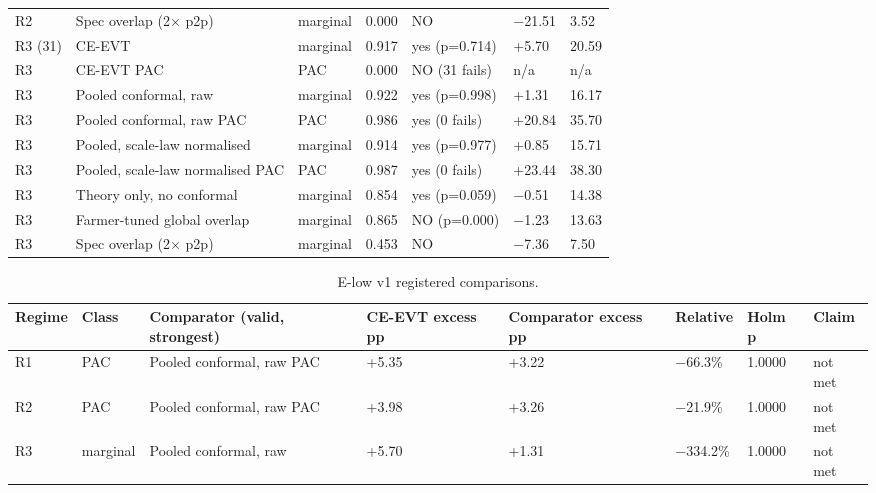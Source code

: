 \documentclass[preprint,12pt,authoryear]{elsarticle}
\begin{document}
\begin{table}[!htbp]
\begin{tabularx}{\textwidth}{@{}>{\raggedright\arraybackslash\hsize=0.70\hsize}X>{\raggedright\arraybackslash\hsize=1.60\hsize}Xll>{\raggedright\arraybackslash\hsize=0.70\hsize}Xll@{}}
R2 & Spec overlap (2× p2p) & marginal & 0.000 & NO & −21.51 & 3.52 \\
R3 (31) & CE-EVT & marginal & 0.917 & yes (p=0.714) & +5.70 & 20.59 \\
R3 & CE-EVT PAC & PAC & 0.000 & NO (31 fails) & n/a & n/a \\
R3 & Pooled conformal, raw & marginal & 0.922 & yes (p=0.998) & +1.31 & 16.17 \\
R3 & Pooled conformal, raw PAC & PAC & 0.986 & yes (0 fails) & +20.84 & 35.70 \\
R3 & Pooled, scale-law normalised & marginal & 0.914 & yes (p=0.977) & +0.85 & 15.71 \\
R3 & Pooled, scale-law normalised PAC & PAC & 0.987 & yes (0 fails) & +23.44 & 38.30 \\
R3 & Theory only, no conformal & marginal & 0.854 & yes (p=0.059) & −0.51 & 14.38 \\
R3 & Farmer-tuned global overlap & marginal & 0.865 & NO (p=0.000) & −1.23 & 13.63 \\
R3 & Spec overlap (2× p2p) & marginal & 0.453 & NO & −7.36 & 7.50 \\
\bottomrule
\end{tabularx}
\end{table}

\begin{table}[!htbp]
\centering
\scriptsize
\renewcommand{\thetable}{S7}\caption{E-low v1 registered comparisons.}
\begin{tabularx}{\textwidth}{@{}ll>{\raggedright\arraybackslash\hsize=1.42\hsize}X>{\raggedright\arraybackslash\hsize=0.79\hsize}X>{\raggedright\arraybackslash\hsize=0.79\hsize}Xlll@{}}
\toprule
\textbf{Regime} & \textbf{Class} & \textbf{Comparator (valid, strongest)} & \textbf{CE-EVT excess pp} & \textbf{Comparator excess pp} & \textbf{Relative} & \textbf{Holm p} & \textbf{Claim} \\
\midrule
R1 & PAC & Pooled conformal, raw PAC & +5.35 & +3.22 & −66.3\% & 1.0000 & not met \\
R2 & PAC & Pooled conformal, raw PAC & +3.98 & +3.26 & −21.9\% & 1.0000 & not met \\
R3 & marginal & Pooled conformal, raw & +5.70 & +1.31 & −334.2\% & 1.0000 & not met \\
\bottomrule
\end{tabularx}
\end{table}
\end{document}
